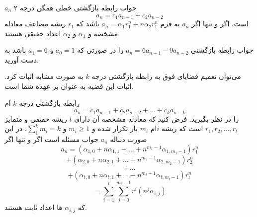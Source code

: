 \begin{THEOREM}
    \p
    \p$a_n$
    جواب رابطه‌ بازگشتی خطی همگن درجه ۲ 
    $$a_n=c_1 a_{n-1}+c_2 a_{n-2}$$
    است، اگر و تنها اگر
    $a_n$
    به فرم
    $a_n=\alpha_1 r_1^n+n\alpha_2 r_1^n$ 
    باشد
    که
    $r_1$
    ریشه مضاعف معادله مشخصه و 
    $\alpha_1$
    و
    $\alpha_2$
    اعداد حقیقی
    هستند.

\end{THEOREM}
\begin{PROBLEM}
    \p
    جواب رابطه‌ بازگشتی 
    $a_n=6a_{n-1}-9a_{n-2}$
    را در صورتی که
    $a_0=1$
    و
    $a_1=6$
    باشد به دست آورید.
\end{PROBLEM}
\p
می‌توان تعمیم قضایای فوق به رابطه‌ بازگشتی درجه
$k$
به صورت مشابه اثبات کرد.
اثبات این قضیه
به عنوان 
 بر عهده شما است.
%


\begin{THEOREM}
    \p
    رابطه‌ بازگشتی درجه 
    $k$
    ام
    \[a_n=c_{1}a_{n-1}+c_{2}a_{n-2}+...+c_{k}a_{n-k}\]
    را در نظر بگیرید. فرض کنید که معادله مشخصه آن دارای 
    $t$
    ریشه حقیقی و متمایز 
    $r_1, r_2, ..., r_t $
    است که ریشه
    $i$ام 
    $m_i$
    بار تکرار شده و  
    $m_i \geq 1$
    و
    $\sum_1^k m_i=k$،
    در این صورت دنباله 
    $a_n$
    جواب مسئله است اگر و تنها اگر
    \[a_n=(\alpha_{1,0}+ n\alpha_{1,1} + ... + n^{m_1-1}\alpha_{1,m_1-1})r_1^n\]
    \[+(\alpha_{2,0}+ n\alpha_{2,1} + ... + n^{m_2-1}\alpha_{2,m_2-1})r_2^n\]
    \[+...\]
    \[+ (\alpha_{t,0} + n\alpha_{t,1} + ... + n^{m_t-1}\alpha_{t,m_t-1})r_t^n\]
    \[=\sum_{i=1}^t\sum_{j=0}^{m_i-1}r^i(n^j\alpha_{i,j})\]
    که
    $\alpha_{i,j}$
    ها
    اعداد ثابت هستند.

\end{THEOREM}

